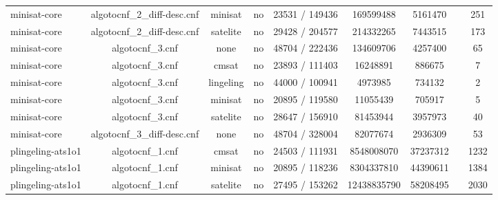 \begin{appendices}
\begin{table}[p]
\begin{center}
\begin{tabular}{l|cccccccc}
  minisat-core                   & algotocnf\_2\_diff-desc.cnf    & minisat    & no    & 23531 / 149436 & 169599488 & 5161470   &            & 251 \\ %
  minisat-core                   & algotocnf\_2\_diff-desc.cnf    & satelite   & no    & 29428 / 204577 & 214332265 & 7443515   &            & 173 \\ %
  minisat-core                   & algotocnf\_3.cnf               & none       & no    & 48704 / 222436 & 134609706 & 4257400   &            & 65 \\ %
  minisat-core                   & algotocnf\_3.cnf               & cmsat      & no    & 23893 / 111403 & 16248891  & 886675    &            & 7 \\ %
  minisat-core                   & algotocnf\_3.cnf               & lingeling  & no    & 44000 / 100941 & 4973985   & 734132    &            & 2 \\ %
  minisat-core                   & algotocnf\_3.cnf               & minisat    & no    & 20895 / 119580 & 11055439  & 705917    &            & 5 \\ %
  minisat-core                   & algotocnf\_3.cnf               & satelite   & no    & 28647 / 156910 & 81453944  & 3957973   &            & 40 \\ %
  minisat-core                   & algotocnf\_3\_diff-desc.cnf    & none       & no    & 48704 / 328004 & 82077674  & 2936309   &            & 53 \\ %
  plingeling-ats1o1              & algotocnf\_1.cnf               & cmsat      & no    & 24503 / 111931 & 8548008070 & 37237312  &            & 1232 \\ %
  plingeling-ats1o1              & algotocnf\_1.cnf               & minisat    & no    & 20895 / 118236 & 8304337810 & 44390611  &            & 1384 \\ %
  plingeling-ats1o1              & algotocnf\_1.cnf               & satelite   & no    & 27495 / 153262 & 12438835790 & 58208495  &            & 2030 \\ %

\end{tabular}
\end{center}
\end{table}
\end{appendices}
